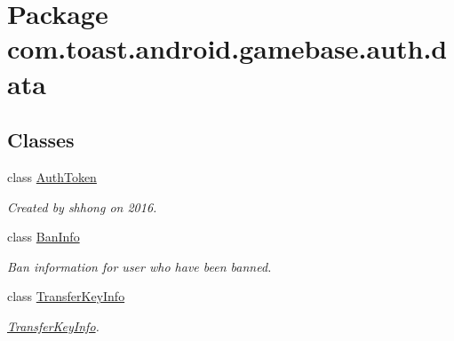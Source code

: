 \hypertarget{namespacecom_1_1toast_1_1android_1_1gamebase_1_1auth_1_1data}{}\section{Package com.\+toast.\+android.\+gamebase.\+auth.\+data}
\label{namespacecom_1_1toast_1_1android_1_1gamebase_1_1auth_1_1data}
\subsection*{Classes}
\begin{DoxyCompactItemize}
\item 
class \hyperlink{classcom_1_1toast_1_1android_1_1gamebase_1_1auth_1_1data_1_1_auth_token}{Auth\+Token}
\begin{DoxyCompactList}\small\item\em Created by shhong on 2016. \end{DoxyCompactList}\item 
class \hyperlink{classcom_1_1toast_1_1android_1_1gamebase_1_1auth_1_1data_1_1_ban_info}{Ban\+Info}
\begin{DoxyCompactList}\small\item\em Ban information for user who have been banned. \end{DoxyCompactList}\item 
class \hyperlink{classcom_1_1toast_1_1android_1_1gamebase_1_1auth_1_1data_1_1_transfer_key_info}{Transfer\+Key\+Info}
\begin{DoxyCompactList}\small\item\em \hyperlink{classcom_1_1toast_1_1android_1_1gamebase_1_1auth_1_1data_1_1_transfer_key_info}{Transfer\+Key\+Info}. \end{DoxyCompactList}\end{DoxyCompactItemize}
